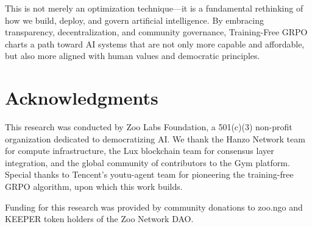 \documentclass[11pt,a4paper]{article}
\begin{document}
This is not merely an optimization technique—it is a fundamental rethinking of how we build, deploy, and govern artificial intelligence. By embracing transparency, decentralization, and community governance, Training-Free GRPO charts a path toward AI systems that are not only more capable and affordable, but also more aligned with human values and democratic principles.

\section*{Acknowledgments}

This research was conducted by Zoo Labs Foundation, a 501(c)(3) non-profit organization dedicated to democratizing AI. We thank the Hanzo Network team for compute infrastructure, the Lux blockchain team for consensus layer integration, and the global community of contributors to the Gym platform. Special thanks to Tencent's youtu-agent team for pioneering the training-free GRPO algorithm, upon which this work builds.

Funding for this research was provided by community donations to zoo.ngo and KEEPER token holders of the Zoo Network DAO.
\end{document}
